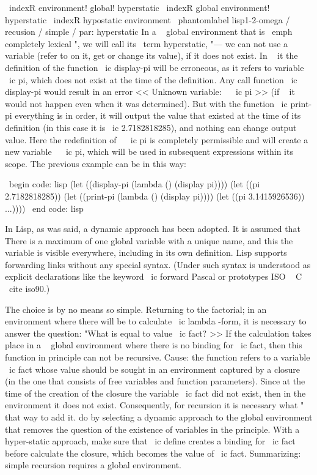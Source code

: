 \ indexR {environment! global! hyperstatic}
\ indexR {global environment! hyperstatic}
\ indexR {hypostatic environment}
\ phantomlabel {lisp1-2-omega / recusion / simple / par: hyperstatic}
In a ~ global environment that is \ emph {completely lexical} ", we will call
its \ term {hyperstatic}, "--- we can not use a variable (refer to
on it, get or change its value), if it does not exist. In ~ it
the definition of the function \ ic {display-pi} will be erroneous, as it refers to
variable ~ \ ic {pi}, which does not exist at the time of the definition. Any call
function \ ic {display-pi} would result in an error << Unknown variable: ~ \ ic {pi} >>
(if ~ it would not happen even when it was determined). But with the function \ ic {print-pi}
everything is in order, it will output the value that existed at the time of its
definition (in this case it is \ ic {2.7182818285}), and nothing can change
output value. Here the redefinition of ~ \ ic {pi} is completely permissible and will create
a new variable ~ \ ic {pi}, which will be used in subsequent expressions
within its scope. The previous example can be
in this way:

\ begin {code: lisp}
(let ((display-pi (lambda () (display pi))))
  (let ((pi 2.7182818285))
    (let ((print-pi (lambda () (display pi))))
      (let ((pi 3.1415926536))
        ...))))
\ end {code: lisp}

In Lisp, as was said, a dynamic approach has been adopted. It is assumed that
There is a maximum of one global variable with a unique name, and this
the variable is visible everywhere, including in its own definition. Lisp
supports forwarding links without any special syntax. (Under
such syntax is understood as explicit declarations like the keyword \ ic {forward}
Pascal or prototypes ISO ~ C ~ \ cite {iso90}.)

The choice is by no means so simple. Returning to the factorial; in an environment where there will be
to calculate \ ic {lambda} -form, it is necessary to answer the question: "What is equal to
value \ ic {fact}? >> If the calculation takes place in a ~ global environment where there is no
binding for \ ic {fact}, then this function in principle can not be recursive.
Cause: the function refers to a variable \ ic {fact} whose value
should be sought in an environment captured by a closure (in the one that consists of
free variables and function parameters). Since at the time of the creation of the closure
the variable \ ic {fact} did not exist, then in the environment it does not exist. Consequently,
for recursion it is necessary what "~ that way to add it.
do by selecting a dynamic approach to the global environment that removes
the question of the existence of variables in the principle. With a hyper-static approach,
make sure that \ ic {define} creates a binding for \ ic {fact} before
calculate the closure, which becomes the value of \ ic {fact}. Summarizing: simple
recursion requires a global environment.


